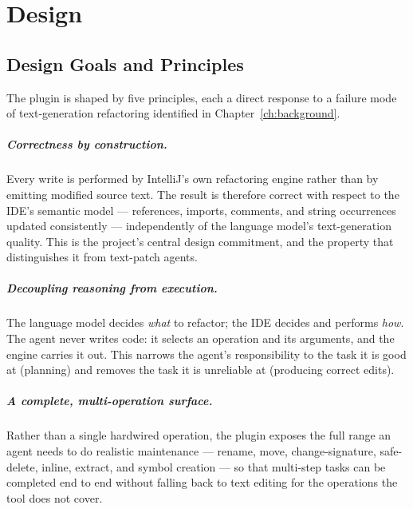 %
\chapter{Design}
\label{ch:design}

\section{Design Goals and Principles}
\label{sec:design-principles}

The plugin is shaped by five principles, each a direct response to a failure mode
of text-generation refactoring identified in Chapter~\ref{ch:background}.

\paragraph{Correctness by construction.} Every write is performed by IntelliJ's
own refactoring engine rather than by emitting modified source text. The result
is therefore correct with respect to the IDE's semantic model --- references,
imports, comments, and string occurrences updated consistently --- independently
of the language model's text-generation quality. This is the project's central
design commitment, and the property that distinguishes it from text-patch agents.

\paragraph{Decoupling reasoning from execution.} The language model decides
\emph{what} to refactor; the IDE decides and performs \emph{how}. The agent never
writes code: it selects an operation and its arguments, and the engine carries it
out. This narrows the agent's responsibility to the task it is good at (planning)
and removes the task it is unreliable at (producing correct edits).

\paragraph{A complete, multi-operation surface.} Rather than a single hardwired
operation, the plugin exposes the full range an agent needs to do realistic
maintenance --- rename, move, change-signature, safe-delete, inline, extract, and
symbol creation --- so that multi-step tasks can be completed end to end without
falling back to text editing for the operations the tool does not cover.

